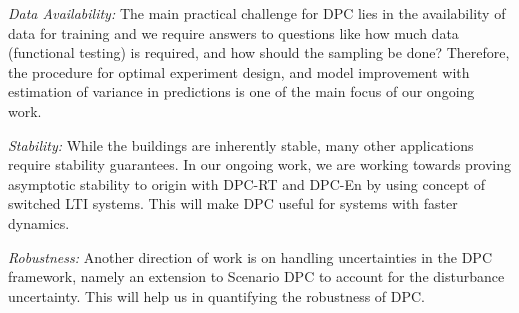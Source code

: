 \textit{Data Availability:} The main practical challenge for DPC lies in the availability of data for training and we require answers to questions like how much data (functional testing) is required, and how should the sampling be done? Therefore, the procedure for optimal experiment design, and model improvement with estimation of variance in predictions is one of the main focus of our ongoing work.

\textit{Stability:} While the buildings are inherently stable, many other applications require stability guarantees. In our ongoing work, we are working towards proving asymptotic stability to origin with DPC-RT and DPC-En by using concept of switched LTI systems. This will make DPC useful for systems with faster dynamics.

\textit{Robustness:} Another direction of work is on handling uncertainties in the DPC framework, namely an extension to Scenario DPC to account for the disturbance uncertainty. This will help us in quantifying the robustness of DPC.
